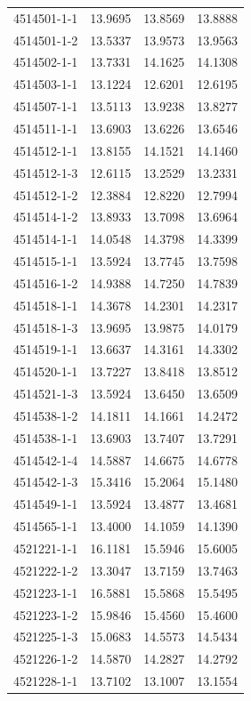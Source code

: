 \begin{longtable}{lrrr}
4514501-1-1 & 13.9695 & 13.8569 & 13.8888 \\
4514501-1-2 & 13.5337 & 13.9573 & 13.9563 \\
4514502-1-1 & 13.7331 & 14.1625 & 14.1308 \\
4514503-1-1 & 13.1224 & 12.6201 & 12.6195 \\
4514507-1-1 & 13.5113 & 13.9238 & 13.8277 \\
4514511-1-1 & 13.6903 & 13.6226 & 13.6546 \\
4514512-1-1 & 13.8155 & 14.1521 & 14.1460 \\
4514512-1-3 & 12.6115 & 13.2529 & 13.2331 \\
4514512-1-2 & 12.3884 & 12.8220 & 12.7994 \\
4514514-1-2 & 13.8933 & 13.7098 & 13.6964 \\
4514514-1-1 & 14.0548 & 14.3798 & 14.3399 \\
4514515-1-1 & 13.5924 & 13.7745 & 13.7598 \\
4514516-1-2 & 14.9388 & 14.7250 & 14.7839 \\
4514518-1-1 & 14.3678 & 14.2301 & 14.2317 \\
4514518-1-3 & 13.9695 & 13.9875 & 14.0179 \\
4514519-1-1 & 13.6637 & 14.3161 & 14.3302 \\
4514520-1-1 & 13.7227 & 13.8418 & 13.8512 \\
4514521-1-3 & 13.5924 & 13.6450 & 13.6509 \\
4514538-1-2 & 14.1811 & 14.1661 & 14.2472 \\
4514538-1-1 & 13.6903 & 13.7407 & 13.7291 \\
4514542-1-4 & 14.5887 & 14.6675 & 14.6778 \\
4514542-1-3 & 15.3416 & 15.2064 & 15.1480 \\
4514549-1-1 & 13.5924 & 13.4877 & 13.4681 \\
4514565-1-1 & 13.4000 & 14.1059 & 14.1390 \\
4521221-1-1 & 16.1181 & 15.5946 & 15.6005 \\
4521222-1-2 & 13.3047 & 13.7159 & 13.7463 \\
4521223-1-1 & 16.5881 & 15.5868 & 15.5495 \\
4521223-1-2 & 15.9846 & 15.4560 & 15.4600 \\
4521225-1-3 & 15.0683 & 14.5573 & 14.5434 \\
4521226-1-2 & 14.5870 & 14.2827 & 14.2792 \\
4521228-1-1 & 13.7102 & 13.1007 & 13.1554 \\

\end{longtable}
